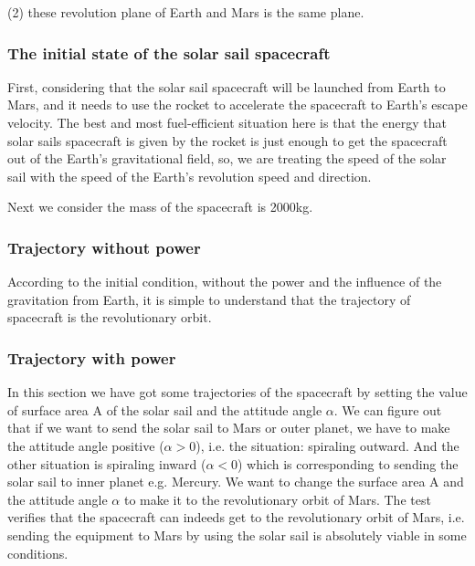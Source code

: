 \documentclass[../Paper.tex]{subfiles}
\begin{document}
(2) these revolution plane of Earth and Mars is the same plane.   

\subsubsection{The initial state of the solar sail spacecraft}

First, considering that the solar sail spacecraft will be launched from Earth to Mars, and it needs to use the rocket to accelerate the spacecraft to Earth's escape velocity. The best and most fuel-efficient situation here is that the energy that solar sails spacecraft is given by the rocket is just enough to get the spacecraft out of the Earth's gravitational field, so, we are treating the speed of the solar sail with the speed of the Earth's revolution speed  and direction.

Next we consider the mass of the spacecraft is 2000kg.

\subsubsection{Trajectory without power}

According to the initial condition, without the power and the influence of the gravitation from Earth, it is simple to understand that the trajectory of spacecraft is the revolutionary orbit.

\subsubsection{Trajectory with power}

In this section we have got some trajectories of the spacecraft by setting the value of surface area A of the solar sail and the attitude angle $\alpha$. We can figure out that if we want to send the solar sail to Mars or outer planet, we have to make the attitude angle positive ($\alpha > 0$),  i.e. the situation: spiraling outward. And the other situation is spiraling inward ($\alpha < 0$) which is corresponding to sending the solar sail to inner planet e.g. Mercury. We want to change the surface area A and the attitude angle $\alpha$ to make it to the revolutionary orbit of Mars. The test verifies that the spacecraft can indeeds get to the revolutionary orbit of Mars, i.e. sending the equipment to Mars by using the solar sail is absolutely viable in some conditions.

\end{document}
